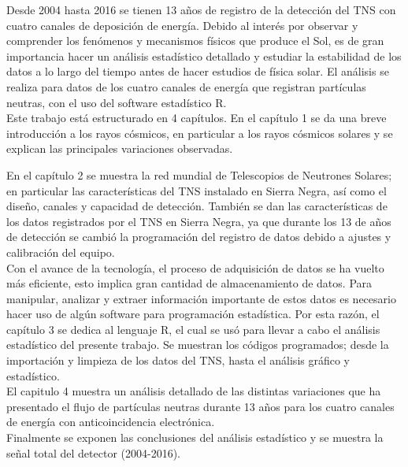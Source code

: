 Desde 2004 hasta 2016 se tienen 13 años de registro de la detección del TNS con cuatro canales de deposición de energía. Debido al interés por observar y comprender los fenómenos y mecanismos físicos que produce el Sol, es de gran importancia hacer un análisis estadístico detallado y estudiar la estabilidad de los datos a lo largo del tiempo antes de hacer estudios de física solar. El análisis se realiza para datos de los cuatro canales de energía que registran partículas neutras, con el uso del software estadístico R.\\


Este trabajo está estructurado en 4 capítulos. En el capítulo 1 se da una breve introducción a los rayos cósmicos, en particular a los rayos cósmicos solares y se explican las principales variaciones observadas.

En el capítulo 2 se muestra la red mundial de Telescopios de Neutrones Solares; en particular las características del TNS instalado en Sierra Negra, así como el diseño, canales y capacidad de detección. También se dan las características de los datos registrados por el TNS en Sierra Negra, ya que durante los 13 de años de detección se cambió la programación del registro de datos debido a ajustes y calibración del equipo.\\ 

Con el avance de la tecnología, el proceso de adquisición de datos se ha vuelto más eficiente, esto implica gran cantidad de almacenamiento de datos. Para manipular, analizar y extraer información importante de estos datos es necesario hacer uso de algún software para programación estadística. Por esta razón, el capítulo 3 se dedica al lenguaje R, el cual se usó para llevar a cabo el análisis estadístico del presente trabajo. Se muestran los códigos programados; desde la importación y limpieza de los datos del TNS, hasta el análisis gráfico y estadístico.\\

El capitulo 4 muestra un análisis detallado de las distintas variaciones que ha presentado el flujo de partículas neutras durante 13 años para los cuatro canales de energía con anticoincidencia electrónica.\\

Finalmente se exponen las conclusiones del análisis estadístico y se muestra la señal total del detector (2004-2016). 